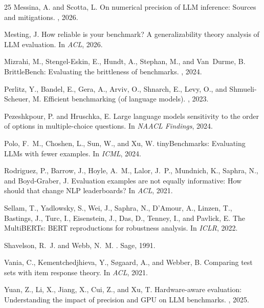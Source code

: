 \documentclass[11pt,letterpaper]{article}
\begin{document}
\begin{thebibliography}{25}
Messina, A. and Scotta, L.
\newblock On numerical precision of LLM inference: Sources and mitigations.
, 2026.

Mesting, J.
\newblock How reliable is your benchmark? A generalizability theory analysis of LLM evaluation.
\newblock In {\em ACL}, 2026.

Mizrahi, M., Stengel-Eskin, E., Hundt, A., Stephan, M., and Van~Durme, B.
\newblock BrittleBench: Evaluating the brittleness of benchmarks.
, 2024.

Perlitz, Y., Bandel, E., Gera, A., Arviv, O., Shnarch, E., Levy, O., and Shmueli-Scheuer, M.
\newblock Efficient benchmarking (of language models).
, 2023.

Pezeshkpour, P. and Hruschka, E.
\newblock Large language models sensitivity to the order of options in multiple-choice questions.
\newblock In {\em NAACL Findings}, 2024.

Polo, F.~M., Choshen, L., Sun, W., and Xu, W.
\newblock tinyBenchmarks: Evaluating LLMs with fewer examples.
\newblock In {\em ICML}, 2024.

Rodriguez, P., Barrow, J., Hoyle, A.~M., Lalor, J.~P., Mundnich, K., Saphra, N., and Boyd-Graber, J.
\newblock Evaluation examples are not equally informative: How should that change NLP leaderboards?
\newblock In {\em ACL}, 2021.

Sellam, T., Yadlowsky, S., Wei, J., Saphra, N., D'Amour, A., Linzen, T., Bastings, J., Turc, I., Eisenstein, J., Das, D., Tenney, I., and Pavlick, E.
\newblock The MultiBERTs: BERT reproductions for robustness analysis.
\newblock In {\em ICLR}, 2022.

Shavelson, R.~J. and Webb, N.~M.
.
\newblock Sage, 1991.

Vania, C., Kementchedjhieva, Y., S{\o}gaard, A., and Webber, B.
\newblock Comparing test sets with item response theory.
\newblock In {\em ACL}, 2021.

Yuan, Z., Li, X., Jiang, X., Cui, Z., and Xu, T.
\newblock Hardware-aware evaluation: Understanding the impact of precision and GPU on LLM benchmarks.
, 2025.

\end{thebibliography}
\end{document}
